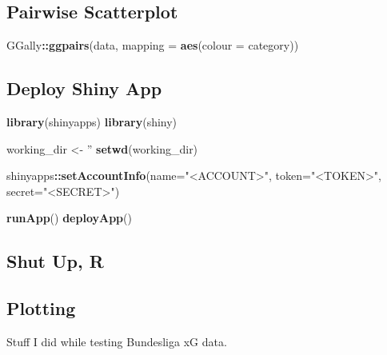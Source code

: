 \documentclass[]{book}
\newenvironment{Shaded}{\begin{snugshade}}{\end{snugshade}}
\newcommand{\KeywordTok}[1]{\textcolor[rgb]{0.13,0.29,0.53}{\textbf{#1}}}
\newcommand{\DataTypeTok}[1]{\textcolor[rgb]{0.13,0.29,0.53}{#1}}
\newcommand{\StringTok}[1]{\textcolor[rgb]{0.31,0.60,0.02}{#1}}
\newcommand{\OperatorTok}[1]{\textcolor[rgb]{0.81,0.36,0.00}{\textbf{#1}}}
\newcommand{\NormalTok}[1]{#1}
\theoremstyle{definition}
\theoremstyle{definition}
\theoremstyle{definition}
\theoremstyle{remark}
\begin{document}
\subsection{Pairwise Scatterplot}\label{pairwise-scatterplot}

\begin{Shaded}
\begin{Highlighting}[]
\NormalTok{GGally}\OperatorTok{::}\KeywordTok{ggpairs}\NormalTok{(data, }\DataTypeTok{mapping =} \KeywordTok{aes}\NormalTok{(}\DataTypeTok{colour =}\NormalTok{ category))}
\end{Highlighting}
\end{Shaded}

\subsection{Deploy Shiny App}\label{deploy-shiny-app}

\begin{Shaded}
\begin{Highlighting}[]
\KeywordTok{library}\NormalTok{(shinyapps)}
\KeywordTok{library}\NormalTok{(shiny)}

\NormalTok{working_dir <-}\StringTok{ ''}
\KeywordTok{setwd}\NormalTok{(working_dir)}

\NormalTok{shinyapps}\OperatorTok{::}\KeywordTok{setAccountInfo}\NormalTok{(}\DataTypeTok{name=}\StringTok{"<ACCOUNT>"}\NormalTok{, }
                          \DataTypeTok{token=}\StringTok{"<TOKEN>"}\NormalTok{, }
                          \DataTypeTok{secret=}\StringTok{"<SECRET>"}\NormalTok{)}

\KeywordTok{runApp}\NormalTok{()}
\KeywordTok{deployApp}\NormalTok{()}
\end{Highlighting}
\end{Shaded}

\subsection{Shut Up, R}\label{shut-up-r}

\subsection{Plotting}\label{plotting}

Stuff I did while testing Bundesliga xG data.
\end{document}
